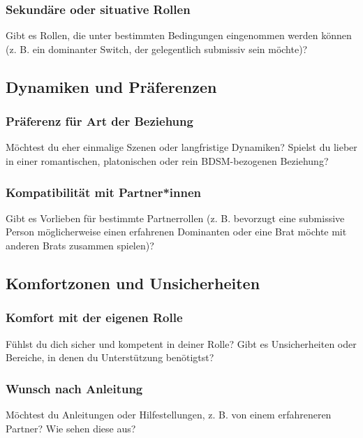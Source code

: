 \documentclass[a4paper,12pt]{article}
\begin{document}
\subsubsection{Sekundäre oder situative Rollen}
\noindent Gibt es Rollen, die unter bestimmten Bedingungen eingenommen werden können (z. B. ein dominanter Switch, der gelegentlich submissiv sein möchte)?\newline
\noindent \TextField[name=ErfahrungAndereRolle,multiline=true,height=7em, width=37em]{}

\subsection{Dynamiken und Präferenzen}
\subsubsection{Präferenz für Art der Beziehung}
\noindent Möchtest du eher einmalige Szenen oder langfristige Dynamiken? Spielst du lieber in einer romantischen, platonischen oder rein BDSM-bezogenen Beziehung?\newline
\noindent \TextField[name=PraefDynamik,multiline=true,height=7em, width=37em]{}

\subsubsection{Kompatibilität mit Partner*innen}
\noindent Gibt es Vorlieben für bestimmte Partnerrollen (z. B. bevorzugt eine submissive Person möglicherweise einen erfahrenen Dominanten oder eine Brat möchte mit anderen Brats zusammen spielen)?\newline
\noindent \TextField[name=PraefKomp,multiline=true,height=7em, width=37em]{}

\subsection{Komfortzonen und Unsicherheiten}
\subsubsection{Komfort mit der eigenen Rolle}
\noindent Fühlst du dich sicher und kompetent in deiner Rolle? Gibt es Unsicherheiten oder Bereiche, in denen du Unterstützung benötigtst?\newline
\noindent \TextField[name=ComfUnRolle,multiline=true,height=7em, width=37em]{}

\subsubsection{Wunsch nach Anleitung}
\noindent Möchtest du Anleitungen oder Hilfestellungen, z. B. von einem erfahreneren Partner? Wie sehen diese aus? \newline
\noindent \TextField[name=ComfUnHilfe,multiline=true,height=7em, width=37em]{}
\end{document}
